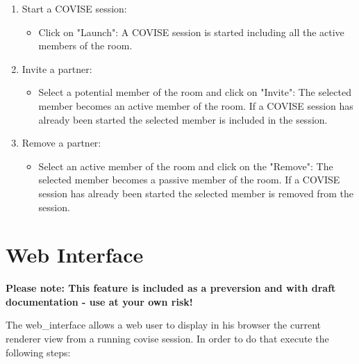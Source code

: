 \begin{enumerate}
\item   Start a COVISE session:
	\begin{itemize}
        	\item  	Click on "Launch": \newline
			A COVISE session is started including
        		all the active members of the room.
	\end{itemize}
	
\item   Invite a partner:
	\begin{itemize}
        	\item  	Select a potential member of the room and click on "Invite": \newline
			The selected member becomes an active member of the
        		room. If a COVISE session has already been started the selected
        		member is included in the session.
	\end{itemize}
	
\item   Remove a partner:
        \begin{itemize}
		\item 	Select an active member of the room and click on the "Remove": \newline
			The selected member becomes a passive member of
          		the room. If a COVISE session has already been started 
			the selected member is removed from the session.
	
	\end{itemize}
\end{enumerate}
	
        		

\clearpage

\section{Web Interface}
\label{WebInterface}

{\bf Please note: This feature is included as a preversion and with draft documentation - use at your own risk!}

  The web\_interface allows a web user to display in his browser
  the current renderer view from a running covise session.
  In order to do that execute the following steps:
  

